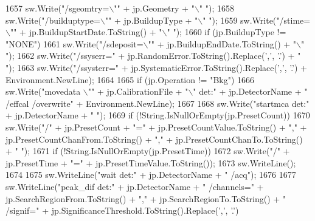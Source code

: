 \begin{DoxyCode}
1657             sw.Write(\textcolor{stringliteral}{"/sgeomtry=\(\backslash\)""} + jp.Geometry + \textcolor{stringliteral}{"\(\backslash\)" "});
1658             sw.Write(\textcolor{stringliteral}{"/builduptype=\(\backslash\)""} + jp.BuildupType + \textcolor{stringliteral}{"\(\backslash\)" "});
1659             sw.Write(\textcolor{stringliteral}{"/stime=\(\backslash\)""} + jp.BuildupStartDate.ToString() + \textcolor{stringliteral}{"\(\backslash\)" "});
1660             \textcolor{keywordflow}{if} (jp.BuildupType != \textcolor{stringliteral}{"NONE"})
1661                 sw.Write(\textcolor{stringliteral}{"/sdeposit=\(\backslash\)""} + jp.BuildupEndDate.ToString() + \textcolor{stringliteral}{"\(\backslash\)" "});
1662             sw.Write(\textcolor{stringliteral}{"/ssyserr="} + jp.RandomError.ToString().Replace(\textcolor{charliteral}{','}, \textcolor{charliteral}{'.'}) + \textcolor{stringliteral}{" "});
1663             sw.Write(\textcolor{stringliteral}{"/ssysterr="} + jp.SystematicError.ToString().Replace(\textcolor{charliteral}{','}, \textcolor{charliteral}{'.'}) + Environment.NewLine);
1664 
1665             \textcolor{keywordflow}{if} (jp.Operation != \textcolor{stringliteral}{"Bkg"})
1666                 sw.Write(\textcolor{stringliteral}{"movedata \(\backslash\)""} + jp.CalibrationFile + \textcolor{stringliteral}{"\(\backslash\)" det:"} + jp.DetectorName + \textcolor{stringliteral}{" /effcal
       /overwrite"} + Environment.NewLine);
1667 
1668             sw.Write(\textcolor{stringliteral}{"startmca det:"} + jp.DetectorName + \textcolor{stringliteral}{" "});
1669             \textcolor{keywordflow}{if} (!String.IsNullOrEmpty(jp.PresetCount))
1670                 sw.Write(\textcolor{stringliteral}{"/"} + jp.PresetCount + \textcolor{stringliteral}{"="} + jp.PresetCountValue.ToString() + \textcolor{stringliteral}{","} + 
      jp.PresetCountChanFrom.ToString() + \textcolor{stringliteral}{","} + jp.PresetCountChanTo.ToString() + \textcolor{stringliteral}{" "});
1671             \textcolor{keywordflow}{if} (!String.IsNullOrEmpty(jp.PresetTime))
1672                 sw.Write(\textcolor{stringliteral}{"/"} + jp.PresetTime + \textcolor{stringliteral}{"="} + jp.PresetTimeValue.ToString());
1673             sw.WriteLine();
1674 
1675             sw.WriteLine(\textcolor{stringliteral}{"wait det:"} + jp.DetectorName + \textcolor{stringliteral}{" /acq"});
1676 
1677             sw.WriteLine(\textcolor{stringliteral}{"peak\_dif det:"} + jp.DetectorName + \textcolor{stringliteral}{" /channels="} + jp.SearchRegionFrom.ToString()
       + \textcolor{stringliteral}{","} + jp.SearchRegionTo.ToString() + \textcolor{stringliteral}{" /signif="} + jp.SignificanceThreshold.ToString().Replace(\textcolor{charliteral}{','}, \textcolor{charliteral}{'.'}) 

\end{DoxyCode}
